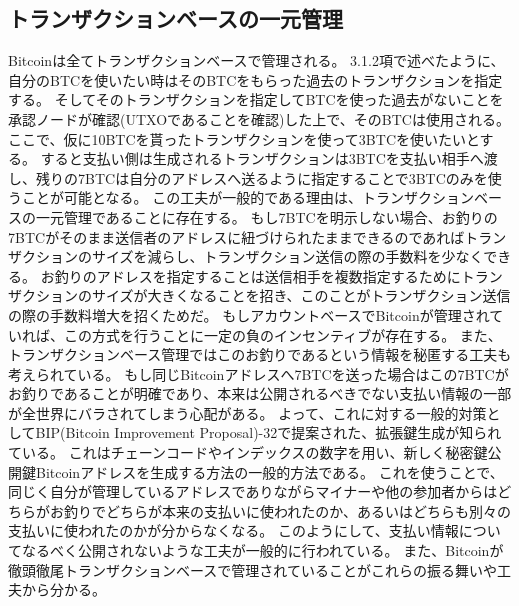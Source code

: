 \subsection{トランザクションベースの一元管理}
Bitcoinは全てトランザクションベースで管理される。
3.1.2項で述べたように、自分のBTCを使いたい時はそのBTCをもらった過去のトランザクションを指定する。
そしてそのトランザクションを指定してBTCを使った過去がないことを承認ノードが確認(UTXOであることを確認)した上で、そのBTCは使用される。
ここで、仮に10BTCを貰ったトランザクションを使って3BTCを使いたいとする。
すると支払い側は生成されるトランザクションは3BTCを支払い相手へ渡し、残りの7BTCは自分のアドレスへ送るように指定することで3BTCのみを使うことが可能となる。
この工夫が一般的である理由は、トランザクションベースの一元管理であることに存在する。
もし7BTCを明示しない場合、お釣りの7BTCがそのまま送信者のアドレスに紐づけられたままできるのであればトランザクションのサイズを減らし、トランザクション送信の際の手数料を少なくできる。
お釣りのアドレスを指定することは送信相手を複数指定するためにトランザクションのサイズが大きくなることを招き、このことがトランザクション送信の際の手数料増大を招くためだ。
もしアカウントベースでBitcoinが管理されていれば、この方式を行うことに一定の負のインセンティブが存在する。
また、トランザクションベース管理ではこのお釣りであるという情報を秘匿する工夫も考えられている。
もし同じBitcoinアドレスへ7BTCを送った場合はこの7BTCがお釣りであることが明確であり、本来は公開されるべきでない支払い情報の一部が全世界にバラされてしまう心配がある。
よって、これに対する一般的対策としてBIP(Bitcoin Improvement Proposal)-32で提案された、拡張鍵生成が知られている。
これはチェーンコードやインデックスの数字を用い、新しく秘密鍵公開鍵Bitcoinアドレスを生成する方法の一般的方法である。
これを使うことで、同じく自分が管理しているアドレスでありながらマイナーや他の参加者からはどちらがお釣りでどちらが本来の支払いに使われたのか、あるいはどちらも別々の支払いに使われたのかが分からなくなる。
このようにして、支払い情報についてなるべく公開されないような工夫が一般的に行われている。
また、Bitcoinが徹頭徹尾トランザクションベースで管理されていることがこれらの振る舞いや工夫から分かる。

